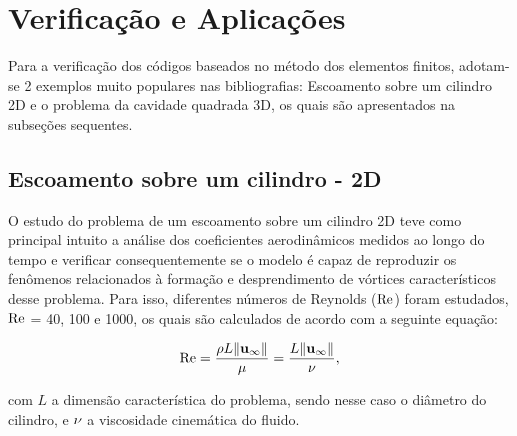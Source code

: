 \documentclass[tese_patricia]{subfiles}%
\begin{document}
\section{Verificação e Aplicações}

Para a verificação dos códigos baseados no método dos elementos finitos, adotam-se 2 exemplos muito populares nas bibliografias: Escoamento sobre um cilindro 2D e o problema da cavidade quadrada 3D, os quais são apresentados na subseções sequentes.

\subsection{Escoamento sobre um cilindro - 2D} \label{subsection:escoamentocil2d}

O estudo do problema de um escoamento sobre um cilindro 2D teve como principal intuito a análise dos coeficientes aerodinâmicos medidos ao longo do tempo e verificar consequentemente se o modelo é capaz de reproduzir os fenômenos relacionados à formação e desprendimento de vórtices característicos desse problema. Para isso, diferentes números de Reynolds ($\mathrm{Re}$) foram estudados, $\mathrm{Re}$ = 40, 100 e 1000, os quais são calculados de acordo com a seguinte equação:

\begin{align}
	\mathrm{Re} = \frac{\rho L \lVert\mathbf{u}_{\infty}\lVert}{\mu} = \frac{L \lVert \mathbf{u}_{\infty} \lVert}{\nu}, \label{eq:Reynolds}
\end{align}

\noindent com $L$ a dimensão característica do problema, sendo nesse caso o diâmetro do cilindro, e $\nu$ a viscosidade cinemática do fluido. 
\end{document}
